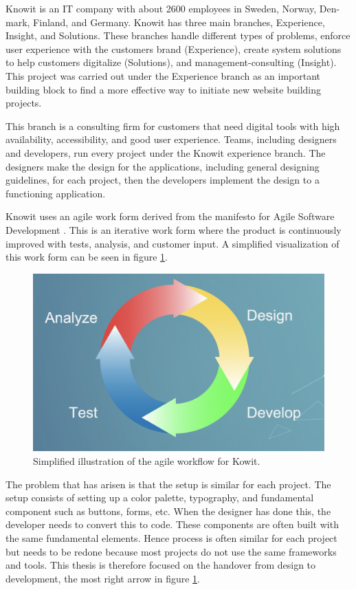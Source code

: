 Knowit is an IT company with about 2600 employees in Sweden, Norway, Den- mark, Finland, and Germany. Knowit has three main branches, Experience, Insight, and Solutions. These branches handle different types of problems, enforce user experience with the customers brand (Experience), create system solutions to help customers digitalize (Solutions), and management-consulting (Insight). This project was carried out under the Experience branch as an important building block to find a more effective way to initiate new website building projects. 

This branch is a consulting firm for customers that need digital tools with high availability, accessibility, and good user experience. Teams, including designers and developers, run every project under the Knowit experience branch. The designers make the design for the applications, including general designing guidelines, for each project, then the developers implement the design to a functioning application. 

Knowit uses an agile work form derived from the manifesto for Agile Software Development \cite{ManifestoAgileSoftware}. This is an iterative work form where the product is continuously improved with tests, analysis, and customer input. A simplified visualization of this work form can be seen in figure \ref{fig:agile}.

\begin{figure}[H]
  \centering
  \includegraphics[width=0.8\linewidth]{images/agile.png}
  \caption{Simplified illustration of the agile workflow for Kowit.}%
  \label{fig:agile}
\end{figure}

The problem that has arisen is that the setup is similar for each project. The setup consists of setting up a color palette, typography, and fundamental \gls{component} such as buttons, forms, etc. When the designer has done this, the developer needs to convert this to code. These components are often built with the same fundamental elements. Hence process is often similar for each project but needs to be redone because most projects do not use the same frameworks and tools. This thesis is therefore focused on the handover from design to development, the most right arrow in figure \ref{fig:agile}.

